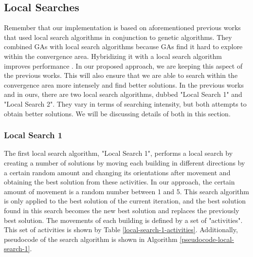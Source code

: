 \subsection{Local Searches}
Remember that our implementation is based on aforementioned previous works that used local search algorithms in conjunction to genetic algorithms. They combined GAs with local search algorithms because GAs find it hard to explore within the convergence area. Hybridizing it with a local search algorithm improves performance \cite{Ripon2013}. In our proposed approach, we are keeping this aspect of the previous works. This will also ensure that we are able to search within the convergence area more intensely and find better solutions. In the previous works and in ours, there are two local search algorithms, dubbed "Local Search 1" and "Local Search 2". They vary in terms of searching intensity, but both attempts to obtain better solutions. We will be discussing details of both in this section.

\subsubsection{Local Search 1}
The first local search algorithm, "Local Search 1", performs a local search by creating a number of solutions by moving each building in different directions by a certain random amount and changing its orientations after movement and obtaining the best solution from these activities. In our approach, the certain amount of movement is a random number between 1 and 5. This search algorithm is only applied to the best solution of the current iteration, and the best solution found in this search becomes the new best solution and replaces the previously best solution. The movements of each building is defined by a set of "activities". This set of activities is shown by Table \ref{local-search-1-activities}. Additionally, pseudocode of the search algorithm is shown in Algorithm \ref{pseudocode-local-search-1}.

